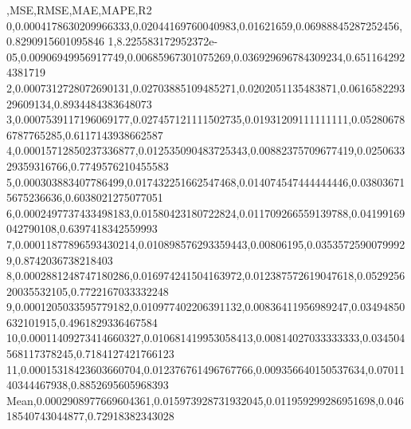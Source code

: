 ,MSE,RMSE,MAE,MAPE,R2
0,0.0004178630209966333,0.02044169760040983,0.01621659,0.06988845287252456,0.8290915601095846
1,8.225583172952372e-05,0.00906949956917749,0.00685967301075269,0.036929696784309234,0.6511642924381719
2,0.0007312728072690131,0.02703885109485271,0.0202051135483871,0.061658229329609134,0.8934484383648073
3,0.0007539117196069177,0.027457121111502735,0.01931209111111111,0.052806786787765285,0.6117143938662587
4,0.00015712850237336877,0.012535090483725343,0.00882375709677419,0.025063329359316766,0.7749576210455583
5,0.000303883407786499,0.017432251662547468,0.014074547444444446,0.038036715675236636,0.6038021275077051
6,0.0002497737433498183,0.01580423180722824,0.011709266559139788,0.04199169042790108,0.6397418342559993
7,0.00011877896593430214,0.010898576293359443,0.00806195,0.03535725900799929,0.8742036738218403
8,0.0002881248747180286,0.016974241504163972,0.012387572619047618,0.052925620035532105,0.7722167033332248
9,0.0001205033595779182,0.010977402206391132,0.00836411956989247,0.03494850632101915,0.4961829336467584
10,0.00011409273414660327,0.010681419953058413,0.00814027033333333,0.034504568117378245,0.7184127421766123
11,0.00015318423603660704,0.012376761496767766,0.009356640150537634,0.0701140344467938,0.8852695605968393
Mean,0.0002908977669604361,0.015973928731932045,0.011959299286951698,0.04618540743044877,0.72918382343028
